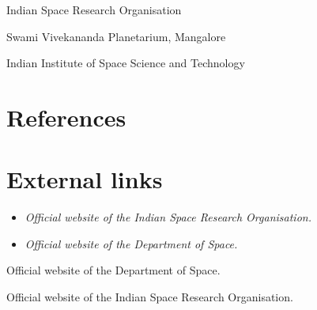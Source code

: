 Indian Space Research Organisation

Swami Vivekananda Planetarium, Mangalore

Indian Institute of Space Science and Technology

\section{References}\label{references}

\section{External links}\label{external-links}

\begin{itemize}
\item
  \emph{Official website of the Indian Space Research Organisation.}
\item
  \emph{Official website of the Department of Space.}
\end{itemize}

Official website of the Department of Space.

Official website of the Indian Space Research Organisation.
